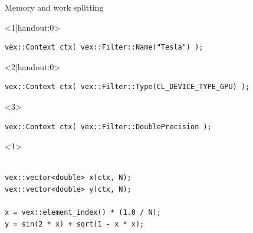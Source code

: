 \documentclass[@BEAMER_OPTIONS@]{beamer}
\begin{document}
\begin{frame}[fragile]{Memory and work splitting}
    \begin{exampleblock}{}
        \begin{onlyenv}<1|handout:0>
        \begin{lstlisting}
vex::Context ctx( vex::Filter::Name("Tesla") );
        \end{lstlisting}
        \end{onlyenv}
        \begin{onlyenv}<2|handout:0>
        \begin{lstlisting}
vex::Context ctx( vex::Filter::Type(CL_DEVICE_TYPE_GPU) );
        \end{lstlisting}
        \end{onlyenv}
        \begin{onlyenv}<3>
        \begin{lstlisting}
vex::Context ctx( vex::Filter::DoublePrecision );
        \end{lstlisting}
        \end{onlyenv}
        \begin{uncoverenv}<1>
        \begin{lstlisting}[firstnumber=last]

vex::vector<double> x(ctx, N);
vex::vector<double> y(ctx, N);

x = vex::element_index() * (1.0 / N);
y = sin(2 * x) + sqrt(1 - x * x);
        \end{lstlisting}
        \end{uncoverenv}
    \end{exampleblock}
    \begin{figure}
\end{figure}
\end{frame}
\end{document}
